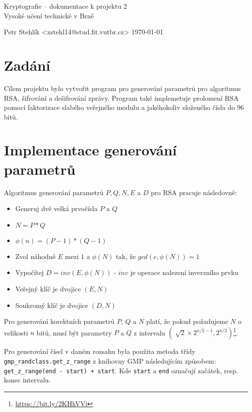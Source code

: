 \documentclass[11pt,a4paper]{article}
\begin{document}
\begin{center}
	\LARGE{Kryptografie -- dokumentace k projektu 2}\\
	\large{Vysoké učení technické v Brně}
	\vspace{0.2cm}

	Petr Stehlík <xstehl14@stud.fit.vutbr.cz>     \today

\end{center}

\section{Zadání}

Cílem projektu bylo vytvořit program pro generování parametrů pro algoritmus RSA, šifrování a dešifrování zprávy.
Program také implemetuje prolomení RSA pomocí faktorizace slabého veřejného modulu a jakéhokoliv složeného čísla do 96 bitů.

\section{Implementace generování parametrů}

Algoritmus generování parametrů $P, Q, N, E$ a $D$ pro RSA pracuje následovně:

\begin{itemize}
    \item Generuj dvě velká prvočísla $P$ a $Q$
    \item $N = P * Q$
    \item $\phi(n) = (P - 1) * (Q - 1)$
    \item Zvol náhodně $E$ mezi $1$ a $\phi(N)$ tak, že $gcd(e, \phi(N)) = 1$
    \item Vypočítej $D = inv(E, \phi(N))$ - $inv$ je operace nalezení inverzního prvku
    \item Veřejný klíč je dvojice $(E, N)$
    \item Soukromý klíč je dvojice $(D, N)$
\end{itemize}

Pro generování korektních parametrů $P$, $Q$ a $N$ platí, že pokud požadujeme $N$ o velikosti $n$ bitů, musí být parametry
$P$ a $Q$ z intervalu $(\sqrt[]2 \times 2^{n/2 - 1}, 2^{n/2})$\footnote{\url{https://bit.ly/2KHkVVi}}.

Pro generování čísel v daném rozsahu byla použita metoda třídy \texttt{gmp\_randclass.get\_z\_range} z knihovny GMP
následujícím způsobem: \texttt{get\_z\_range(end - start) + start}. Kde \texttt{start} a \texttt{end} označují začátek,
resp. konec intervalu.
\end{document}
